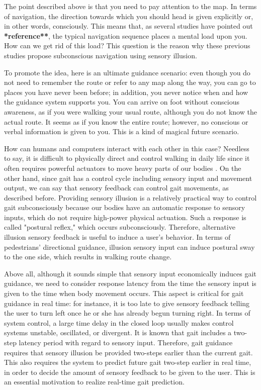 \documentclass{sigchi}
\begin{document}
The point described above is that you need to pay attention to the map. In terms of navigation, the direction towards which you should head is given explicitly or, in other words, consciously.
This means that, as several studies have pointed out {\bf **reference**}, the typical navigation sequence places a mental load upon you. How can we get rid of this load? This question is the reason why these previous studies propose subconscious navigation using sensory illusion.

To promote the idea, here is an ultimate guidance scenario: even though you do not need to remember the route or refer to any map along the way, you can go to places you have never been before; in addition, you never notice when and how the guidance system supports you. You can arrive on foot without conscious awareness, as if you were walking your usual route, although you do not know the actual route. It seems as if you know the entire route; however, no conscious or verbal information is given to you. This is a kind of magical future scenario.

How can humans and computers interact with each other in this case? Needless to say, it is difficult to physically direct and control walking in daily life since it often requires powerful actuators to move heavy parts of our bodies \cite{doi:10.3109/03093648709078194} \cite{DOMINGO2009464}. On the other hand, since gait has a control cycle including sensory input and movement output, we can say that sensory feedback can control gait movements, as described before. Providing sensory illusion \cite{Watanabe2010} \cite{Watanabe:2005:SII:1152399.1152406} is a relatively practical way to control gait subconsciously because our bodies have an automatic response to sensory inputs, which do not require high-power physical actuation. Such a response is called "postural reflex," which occurs subconsciously. Therefore, alternative illusion sensory feedback is useful to induce a user's behavior. In terms of pedestrians' directional guidance, illusion sensory input can induce postural sway to the one side, which results in walking route change. 


Above all, although it sounds simple that sensory input economically induces gait guidance, we need to consider response latency from the time the sensory input is given to the time when body movement occurs. This aspect is critical for gait guidance in real time: for instance, it is too late to give sensory feedback telling the user to turn left once he or she has already begun turning right. In terms of system control, a large time delay in the closed loop usually makes control systems unstable, oscillated, or divergent. It is known that gait includes a two-step latency period with regard to sensory input. Therefore, gait guidance requires that sensory illusion be provided two-steps earlier than the current gait. This also requires the system to predict future gait two-step earlier in real time, in order to decide the amount of sensory feedback to be given to the user. This is an essential motivation to realize real-time gait prediction.
\end{document}
